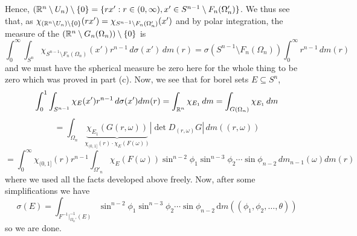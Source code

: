 \documentclass[12pt,a4paper]{article}
\begin{document}
\begin{solution}
\begin{enumerate}[label=(\alph*)]
		Hence, $(\mathbb{R}^n\setminus U_n)\setminus\{0\}=\{rx':r\in(0,\infty),x'\in S^{n-1}\setminus F_n(\Omega_n')\}$. 
		We thus see that, as $\chi_{(\mathbb{R}^n\setminus U_n)\setminus\{0\}}(rx')=\chi_{S^{n-1}\setminus F_n(\Omega_n')}(x')$ and by polar integration, the measure of the $(\mathbb{R}^n\setminus G_n(\Omega_n))\setminus\{0\}$ is
		\[
			\int_0^\infty\int_{S^n}\chi_{S^{n-1}\setminus F_n(\Omega_n)}(x')r^{n-1}\,d\sigma(x')\,dm(r)=\sigma(S^{n-1}\setminus F_n(\Omega_n))\int_0^\infty r^{n-1}\,dm(r)
		\]
		and we must have the spherical measure be zero here for the whole thing to be zero which was proved in part (c). 
		Now, we see that for borel sets $E\subseteq S^n$, 
		\[
			\int_0^1\int_{S^{n-1}}\chi_E(x')r^{n-1}\,d\sigma(x')dm(r)=\int_{\mathbb{R}^n}\chi_{E_1}\,dm=\int_{G(\Omega_n)}\chi_{E_1}\,dm
		\]
		\[
		=\int_{\Omega_n}\underbrace{\chi_{E_1}(G(r,\omega))}_{\chi_{(0,1]}(r)\cdot\chi_E(F(\omega))}|\det D_{(r,\omega)}G|\,dm((r,\omega))
		\]
		\[
			=\int_0^\infty\chi_{(0,1]}(r)r^{n-1}\int_{\Omega'_n}\chi_{E}(F(\omega))\sin^{n-2}\phi_1\sin^{n-3}\phi_2\cdots\sin\phi_{n-2}\,dm_{n-1}(\omega)dm(r)
		\]
		where we used all the facts developed above freely. 
		Now, after some simplifications we have
		\[
		\sigma(E)=\int_{F^{-1}|_{\Omega_n'}^{-1}(E)}\sin^{n-2}\phi_1\sin^{n-3}\phi_2\cdots\sin\phi_{n-2}\,\mathrm{d}m((\phi_1,\phi_2,\ldots,\theta))
		\]	
		so we are done.
\end{enumerate}
\end{solution}
\setcounter{section}{2}
\end{document}
